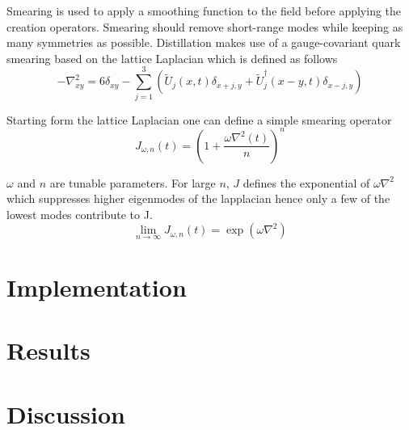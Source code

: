 \documentclass{style}
\begin{document}
	Smearing is used to apply a smoothing function to the field before applying the creation operators. Smearing should remove short-range modes while keeping as many symmetries as possible. Distillation makes use of a gauge-covariant quark smearing based on the lattice Laplacian which is defined as follows
	\begin{equation}
	    -\nabla^2_{xy} = 6\delta_{xy} - \sum^3_{j=1}(\tilde{U}_j(x,t)\delta_{x+j,y} + \tilde{U}^\dagger_j(x-y,t)\delta_{x-j,y})
	\end{equation}
	
	Starting form the lattice Laplacian one can define a simple smearing operator
	\begin{equation}
	    J_{\omega,n}(t) = (1+\frac{\omega\nabla^2(t)}{n})^n
	\end{equation}
	
	$\omega$ and $n$ are tunable parameters. For large $n$, $J$ defines the exponential of $\omega\nabla^2$ which suppresses higher eigenmodes of the lapplacian hence only a few of the lowest modes contribute to J. %
	\begin{equation}
        \lim_{n\rightarrow\infty} J_{\omega,n}(t) = \exp(\omega\nabla^2)
	\end{equation}
	
	
	\section{Implementation}
	
	\section{Results}
	
	\section{Discussion}
	
	
	
\end{document}
